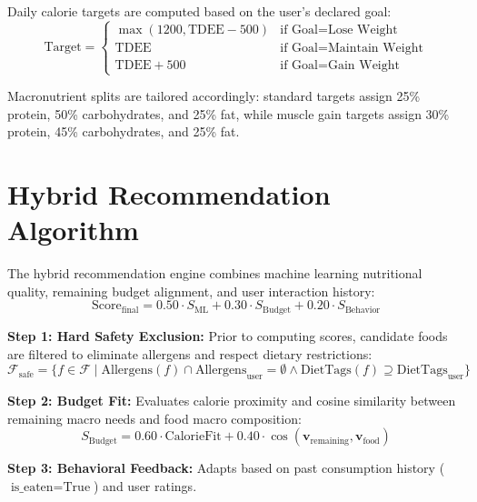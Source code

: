 \documentclass[12pt,a4paper]{report}
\begin{document}
Daily calorie targets are computed based on the user's declared goal:
\begin{equation}
  \text{Target} =
  \begin{cases}
    \max(1200, \text{TDEE} - 500) & \text{if Goal} = \text{Lose Weight} \\
    \text{TDEE}                   & \text{if Goal} = \text{Maintain Weight} \\
    \text{TDEE} + 500             & \text{if Goal} = \text{Gain Weight}
  \end{cases}
\end{equation}

Macronutrient splits are tailored accordingly: standard targets assign 25\% protein, 50\% carbohydrates, and 25\% fat, while muscle gain targets assign 30\% protein, 45\% carbohydrates, and 25\% fat.

\section{Hybrid Recommendation Algorithm}

The hybrid recommendation engine combines machine learning nutritional quality, remaining budget alignment, and user interaction history:
\begin{equation}
  \text{Score}_{\text{final}} = 0.50 \cdot S_{\text{ML}} + 0.30 \cdot S_{\text{Budget}} + 0.20 \cdot S_{\text{Behavior}}
\end{equation}

\textbf{Step 1: Hard Safety Exclusion:} Prior to computing scores, candidate foods are filtered to eliminate allergens and respect dietary restrictions:
\begin{equation}
  \mathcal{F}_{\text{safe}} = \{ f \in \mathcal{F} \mid \text{Allergens}(f) \cap \text{Allergens}_{\text{user}} = \emptyset \land \text{DietTags}(f) \supseteq \text{DietTags}_{\text{user}} \}
\end{equation}

\textbf{Step 2: Budget Fit:} Evaluates calorie proximity and cosine similarity between remaining macro needs and food macro composition:
\begin{equation}
  S_{\text{Budget}} = 0.60 \cdot \text{CalorieFit} + 0.40 \cdot \cos(\mathbf{v}_{\text{remaining}}, \mathbf{v}_{\text{food}})
\end{equation}

\textbf{Step 3: Behavioral Feedback:} Adapts based on past consumption history ($\text{is\_eaten} = \text{True}$) and user ratings.
\end{document}
